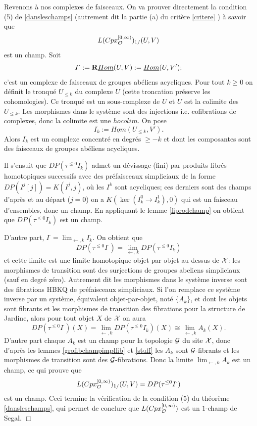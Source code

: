\documentclass[12pt]{article}
\newcommand{\eop}{\hfill $\Box$\vspace{.1in}}
\newcommand{\Gg}{{\cal G}}
\newcommand{\Oo}{{\cal O}}
\newcommand{\Xx}{{\cal X}}
\begin{document}
Revenons \`a nos complexes de faisceaux.
On va prouver directement la condition (5) de \ref{dansleschamps}
(autrement dit la partie (a) du crit\`ere \ref{critere} ) \`a savoir que
$$
L(Cpx_{\Oo}^{[0, \infty )})_{1/}(U,V)
$$
est un champ. 
Soit 
$$
I^{\cdot}:= {\bf R} \underline{Hom} (U,V)
:= \underline{Hom} (U,V'); 
$$
c'est un complexe
de faisceaux de groupes ab\'eliens acycliques. Pour tout $k\geq 0$ on
d\'efinit le tronqu\'e $U_{\leq k}$ du complexe $U$ (cette
troncation pr\'eserve
les cohomologies). Ce tronqu\'e est un sous-complexe de $U$ et $U$ est
la colimite des $U_{\leq k}$. Les morphismes dans le syst\`eme sont
des injections i.e. cofibrations de complexes, donc la colimite est une
$hocolim$. On pose 
$$
I^{\cdot}_{k} :=\underline{Hom} (U_{\leq k},V').
$$
Alors $I^{\cdot }_{k}$ est un complexe concentr\'e en degr\'es $\geq -k$
et dont les composantes sont des faisceaux de groupes ab\'eliens
acycliques. 

Il s'ensuit que 
$DP(\tau ^{\leq 0} I^{\cdot}_{ k})$ admet un d\'evissage (fini) par
produits fibr\'es homotopiques successifs
avec des pr\'efaisceaux simpliciaux
de la forme $DP(I^j[j]) = K(I^j, j)$, o\`u les $I^k$ sont acycliques;
ces derniers sont des champs
d'apr\`es \cite{Jardine} \cite{KBrown} et au d\'epart ($j=0$)
on a $K(\ker (I^0_k\rightarrow I^1_k), 0)$ qui est un faisceau
d'ensembles, donc un champ. En appliquant le lemme \ref{fiprodchamp}
on obtient
que $DP(\tau ^{\leq 0} I^{\cdot}_{k})$ est un champ.


D'autre part, $I^{\cdot} = \lim _{\leftarrow , k} I^{\cdot }_{k}$.
On obtient que
$$
DP(\tau ^{\leq 0} I^{\cdot}) = \lim _{\leftarrow , k}
DP(\tau ^{\leq 0} I^{\cdot}_k)
$$ 
et cette limite est une limite homotopique objet-par-objet au-dessus
de $\Xx$: 
les morphismes de transition
sont des surjections de groupes abeliens simpliciaux 
(sauf en degr\'e z\'ero). Autrement dit
les morphismes dans le syst\`eme inverse sont des fibrations HBKQ
de pr\'efaisceaux simpliciaux. Si l'on remplace
ce syst\`eme inverse par un syst\`eme, \'equivalent objet-par-objet,
not\'e $\{ A_k\}$, et dont les objets sont fibrants et les
morphismes de transition des
fibrations pour la structure de Jardine, alors pour tout objet
$X$ de $\Xx$ on aura
$$
DP(\tau ^{\leq 0} I^{\cdot}) (X) = \lim _{\leftarrow , k}
DP(\tau ^{\leq 0} I^{\cdot}_k)(X)
\cong \lim _{\leftarrow , k} A_k(X).
$$
D'autre part chaque $A_k$ est un champ pour la topologie $\Gg$ du site
$\Xx$, donc d'apr\`es les lemmes
\ref {grofibchampimplfib} et
\ref{stuff} les  $A_k$ sont $\Gg$-fibrants
et les morphismes de transition sont des $\Gg$-fibrations.
Donc la limite $\lim _{\leftarrow , k} A_k$ est un champ,
ce qui prouve que 
$$
L(Cpx_{\Oo}^{[0, \infty )})_{1/}(U,V)
= DP(\tau ^{\leq 0} I^{\cdot})
$$
est un champ. 
Ceci termine la v\'erification de la condition (5) du th\'eor\`eme 
\ref{dansleschamps}, qui permet de conclure que 
$L(Cpx_{\Oo}^{[0,\infty )})$ est un $1$-champ de Segal.
\eop
\end{document}
